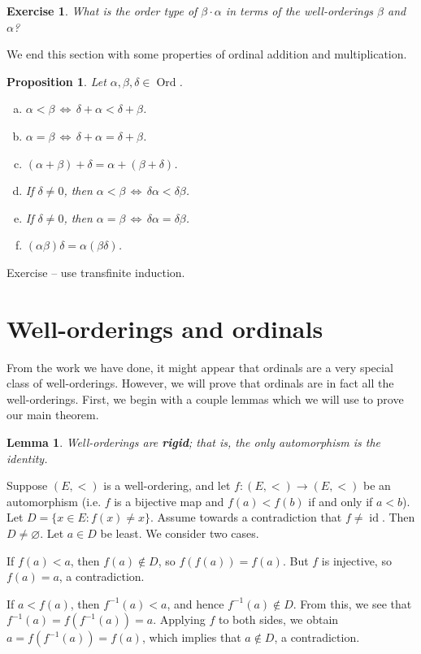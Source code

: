 \documentclass[10pt]{article}
\makeatletter
\DeclareMathOperator{\Ord}{Ord}
\DeclareMathOperator{\id}{id}
\theoremstyle{newstyle}
\newtheorem{lemma}[thm]{Lemma}
\newtheorem{prop}[thm]{Proposition}
\newtheorem{exercise}[thm]{Exercise}
\newenvironment{pf}[1][\proofname]{\par
  \pushQED{\qed}%
  \normalfont \topsep0\p@\relax
  \trivlist
  \item[\hskip\labelsep\scshape
  #1\@addpunct{.}]\ignorespaces
}{%
  \popQED\endtrivlist\@endpefalse
}
\makeatother
\begin{document}
\begin{exercise}
What is the order type of $\beta \cdot \alpha$ in terms of the well-orderings $\beta$ and $\alpha$? 
\end{exercise}

We end this section with some properties of ordinal addition and multiplication.
\begin{prop}
Let $\alpha, \beta, \delta \in \Ord$. 
\begin{enumerate}[(a)]
    \item $\alpha < \beta \,\Leftrightarrow\, \delta + \alpha < \delta + \beta$.
    \item $\alpha = \beta \,\Leftrightarrow\, \delta + \alpha = \delta + \beta$.
    \item $(\alpha + \beta) + \delta = \alpha + (\beta + \delta)$.
    \item If $\delta \neq 0$, then $\alpha < \beta \,\Leftrightarrow\, \delta\alpha < \delta\beta$.
    \item If $\delta \neq 0$, then $\alpha = \beta \,\Leftrightarrow\, \delta\alpha = \delta\beta$.
    \item $(\alpha\beta)\delta = \alpha(\beta\delta)$.
\end{enumerate}
\end{prop}
\begin{pf}
Exercise -- use transfinite induction.
\end{pf}

 
\newpage\section{Well-orderings and ordinals} 
From the work we have done, it might appear that ordinals are a very special class of well-orderings. 
However, we will prove that ordinals are in fact all the well-orderings. 
First, we begin with a couple lemmas which we will use to prove our main theorem. 

\begin{lemma} 
Well-orderings are {\bf rigid}; that is, the only automorphism is the identity. 
\end{lemma} 
\begin{pf}
Suppose $(E, <)$ is a well-ordering, and let $f : (E, <) \to (E, <)$ be an automorphism 
(i.e. $f$ is a bijective map and $f(a) < f(b)$ if and only if $a < b$). 
Let $D = \{x \in E : f(x) \neq x\}$. Assume towards a contradiction that $f \neq \id$. 
Then $D \neq \varnothing$. Let $a \in D$ be least. We consider two cases. 

If $f(a) < a$, then $f(a) \notin D$, so $f(f(a)) = f(a)$. But $f$ is injective, so $f(a) = a$, 
a contradiction. 

If $a < f(a)$, then $f^{-1}(a) < a$, and hence $f^{-1}(a) \notin D$. From this, we see that 
$f^{-1}(a) = f(f^{-1}(a)) = a$. Applying $f$ to both sides, we obtain $a = f(f^{-1}(a)) = f(a)$, 
which implies that $a \notin D$, a contradiction. 
\end{pf}
\end{document}

